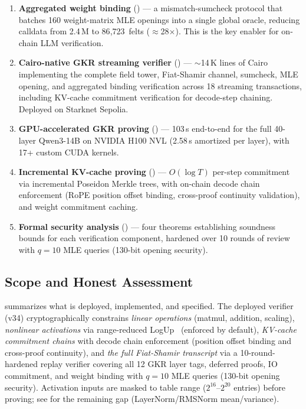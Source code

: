 \documentclass[10pt,twocolumn]{article}
\theoremstyle{definition}
\theoremstyle{remark}
\begin{document}
\begin{enumerate}[nosep,leftmargin=1.4em]
  \item \textbf{Aggregated weight binding} () ---
        a mismatch-sumcheck protocol that batches 160 weight-matrix
        MLE openings into a single global oracle, reducing calldata
        from 2.4\,M to 86{,}723~felts ($\approx$28$\times$).
        This is the key enabler for on-chain LLM verification.
  \item \textbf{Cairo-native GKR streaming verifier}
        () --- $\sim$14\,K lines of Cairo
        implementing the complete field tower, Fiat-Shamir channel,
        sumcheck, MLE opening, and aggregated binding verification
        across 18 streaming transactions, including KV-cache
        commitment verification for decode-step chaining.
        Deployed on Starknet Sepolia.
  \item \textbf{GPU-accelerated GKR proving}
        () --- 103\,s end-to-end for the full 40-layer
        Qwen3-14B on NVIDIA H100 NVL (2.58\,s amortized per layer),
        with 17+ custom CUDA kernels.
  \item \textbf{Incremental KV-cache proving}
        () --- $O(\log T)$ per-step commitment
        via incremental Poseidon Merkle trees, with on-chain
        decode chain enforcement (RoPE position offset binding,
        cross-proof continuity validation), and weight commitment
        caching.
  \item \textbf{Formal security analysis} () ---
        four theorems establishing soundness bounds for each
        verification component, hardened over 10 rounds of review
        with $q\!=\!10$ MLE queries (130-bit opening security).
\end{enumerate}

\subsection{Scope and Honest Assessment}

 summarizes what is deployed, implemented, and
specified.
The deployed verifier (v34) cryptographically constrains
\emph{linear operations} (matmul, addition, scaling),
\emph{nonlinear activations} via range-reduced
LogUp~\cite{habock2022logup} (enforced by default),
\emph{KV-cache commitment chains} with decode chain enforcement
(position offset binding and cross-proof continuity),
and \emph{the full Fiat-Shamir transcript} via a 10-round-hardened
replay verifier covering all 12 GKR layer tags, deferred proofs,
IO commitment, and weight binding with $q\!=\!10$ MLE queries
(130-bit opening security).
Activation inputs are masked to table range ($2^{16}$--$2^{20}$
entries) before proving; see  for the
remaining gap (LayerNorm/RMSNorm mean/variance).
\end{document}
